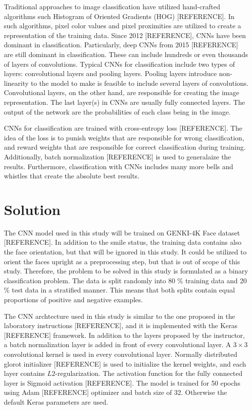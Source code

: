 \documentclass{article}
\begin{document}
Traditional approaches to image classification have utilized
hand-crafted algorithms such Histogram of Oriented Gradients (HOG)
[REFERENCE]. In such algorithms, pixel color values and pixel
proximities are utilized to create a representation of the training
data. Since 2012 [REFERENCE], CNNs have been dominant in
classification. Particularly, deep CNNs from 2015 [REFERENCE] are
still dominant in classification. These can include hundreds or even
thousands of layers of convolutions. Typical CNNs for classification
include two types of layers: convolutional layers and pooling layers.
Pooling layers introduce non-linearity to the model to make is
feasible to include several layers of convolutions. Convolutional
layers, on the other hand, are responsible for creating the image
representation. The last layer(s) in CNNs are usually fully connected
layers. The output of the network are the probabilities of each class
being in the image.

CNNs for classification are trained with cross-entropy loss
[REFERENCE]. The idea of the loss is to punish weights that are
responsible for wrong classification, and reward weights that are
responsible for correct classification during training. Additionally,
batch normalization [REFERENCE] is used to generalaize the results.
Furthermore, classification with CNNs includes many more bells and
whistles that create the absolute best results.

\section{Solution}
The CNN model used in this study will be trained on GENKI-4K Face
dataset [REFERENCE]. In addition to the smile status, the training
data contains also the face orientation, but that will be ignored in
this study. It could be utilized to orient the faces upright as a
preprocessing step, but that is out of scope of this study. Therefore,
the problem to be solved in this study is formulated as a binary
classification problem. The data is split randomly into 80 \% training
data and 20 \% test data in a stratified manner. This means that both
splits contain equal proportions of positive and negative examples.

The CNN archtecture used in this study is similar to the one proposed
in the laboratory instructions [REFERENCE], and it is implemented with
the Keras [REFERENCE] framework. In addition to the layers proposed by
the instructor, a batch normalization layer is added in front of every
convolutional layer. A $3 \times 3$ convolutional kernel is used in
every convolutional layer. Normally distributed glorot initializer
[REFERENCE] is used to initialize the kernel weights, and each layer
contains $L2$-regularization. The activation function for the fully
connected layer is Sigmoid activation [REFERENCE]. The model is
trained for 50 epochs using Adam [REFERENCE] optimizer and batch size
of 32. Otherwise the default Keras parameters are used.
\end{document}
